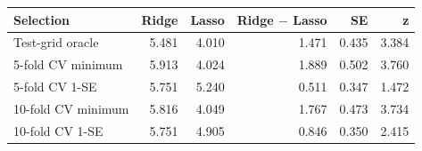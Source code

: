\begin{center}
\small
\setlength{\tabcolsep}{4pt}
\begin{tabular}{lrrrrr}
\toprule
Selection & Ridge & Lasso & Ridge $-$ Lasso & SE & z \\
\midrule
Test-grid oracle & 5.481 & 4.010 & 1.471 & 0.435 & 3.384 \\
5-fold CV minimum & 5.913 & 4.024 & 1.889 & 0.502 & 3.760 \\
5-fold CV 1-SE & 5.751 & 5.240 & 0.511 & 0.347 & 1.472 \\
10-fold CV minimum & 5.816 & 4.049 & 1.767 & 0.473 & 3.734 \\
10-fold CV 1-SE & 5.751 & 4.905 & 0.846 & 0.350 & 2.415 \\
\bottomrule
\end{tabular}
\end{center}
